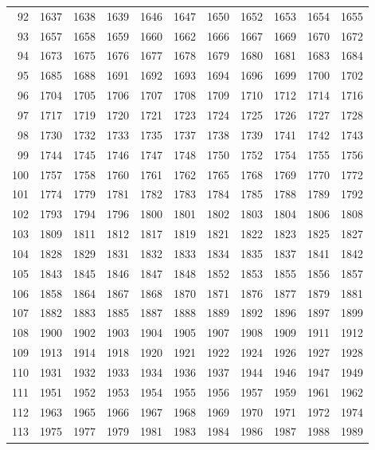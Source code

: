 \begin{longtable}{|r|rrrrrrrrrr|}
  92 & 1637 & 1638 & 1639 & 1646 & 1647 & 1650 & 1652 & 1653 & 1654 & 1655 \\ 
  93 & 1657 & 1658 & 1659 & 1660 & 1662 & 1666 & 1667 & 1669 & 1670 & 1672 \\ 
  94 & 1673 & 1675 & 1676 & 1677 & 1678 & 1679 & 1680 & 1681 & 1683 & 1684 \\ 
  95 & 1685 & 1688 & 1691 & 1692 & 1693 & 1694 & 1696 & 1699 & 1700 & 1702 \\ 
  96 & 1704 & 1705 & 1706 & 1707 & 1708 & 1709 & 1710 & 1712 & 1714 & 1716 \\ 
  97 & 1717 & 1719 & 1720 & 1721 & 1723 & 1724 & 1725 & 1726 & 1727 & 1728 \\ 
  98 & 1730 & 1732 & 1733 & 1735 & 1737 & 1738 & 1739 & 1741 & 1742 & 1743 \\ 
  99 & 1744 & 1745 & 1746 & 1747 & 1748 & 1750 & 1752 & 1754 & 1755 & 1756 \\ 
  100 & 1757 & 1758 & 1760 & 1761 & 1762 & 1765 & 1768 & 1769 & 1770 & 1772 \\ 
  101 & 1774 & 1779 & 1781 & 1782 & 1783 & 1784 & 1785 & 1788 & 1789 & 1792 \\ 
  102 & 1793 & 1794 & 1796 & 1800 & 1801 & 1802 & 1803 & 1804 & 1806 & 1808 \\ 
  103 & 1809 & 1811 & 1812 & 1817 & 1819 & 1821 & 1822 & 1823 & 1825 & 1827 \\ 
  104 & 1828 & 1829 & 1831 & 1832 & 1833 & 1834 & 1835 & 1837 & 1841 & 1842 \\ 
  105 & 1843 & 1845 & 1846 & 1847 & 1848 & 1852 & 1853 & 1855 & 1856 & 1857 \\ 
  106 & 1858 & 1864 & 1867 & 1868 & 1870 & 1871 & 1876 & 1877 & 1879 & 1881 \\ 
  107 & 1882 & 1883 & 1885 & 1887 & 1888 & 1889 & 1892 & 1896 & 1897 & 1899 \\ 
  108 & 1900 & 1902 & 1903 & 1904 & 1905 & 1907 & 1908 & 1909 & 1911 & 1912 \\ 
  109 & 1913 & 1914 & 1918 & 1920 & 1921 & 1922 & 1924 & 1926 & 1927 & 1928 \\ 
  110 & 1931 & 1932 & 1933 & 1934 & 1936 & 1937 & 1944 & 1946 & 1947 & 1949 \\ 
  111 & 1951 & 1952 & 1953 & 1954 & 1955 & 1956 & 1957 & 1959 & 1961 & 1962 \\ 
  112 & 1963 & 1965 & 1966 & 1967 & 1968 & 1969 & 1970 & 1971 & 1972 & 1974 \\ 
  113 & 1975 & 1977 & 1979 & 1981 & 1983 & 1984 & 1986 & 1987 & 1988 & 1989 \\ 

\end{longtable}
